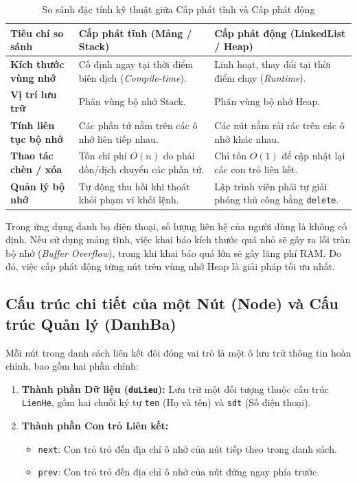 \documentclass[12pt,a4paper]{report}
\begin{document}
\begin{table}[htbp]
    \centering
    \small
    \begin{tabular}{|p{3.5cm}|p{5.5cm}|p{5.5cm}|}
    \hline
    \textbf{Tiêu chí so sánh} & \textbf{Cấp phát tĩnh (Mảng / Stack)} & \textbf{Cấp phát động (LinkedList / Heap)} \\ \hline
    \textbf{Kích thước vùng nhớ} & Cố định ngay tại thời điểm biên dịch (\textit{Compile-time}). & Linh hoạt, thay đổi tại thời điểm chạy (\textit{Runtime}). \\ \hline
    \textbf{Vị trí lưu trữ} & Phân vùng bộ nhớ Stack. & Phân vùng bộ nhớ Heap. \\ \hline
    \textbf{Tính liên tục bộ nhớ} & Các phần tử nằm trên các ô nhớ liên tiếp nhau. & Các nút nằm rải rác trên các ô nhớ khác nhau. \\ \hline
    \textbf{Thao tác chèn / xóa} & Tốn chi phí $O(n)$ do phải dồn/dịch chuyển các phần tử. & Chỉ tốn $O(1)$ để cập nhật lại các con trỏ liên kết. \\ \hline
    \textbf{Quản lý bộ nhớ} & Tự động thu hồi khi thoát khỏi phạm vi khối lệnh. & Lập trình viên phải tự giải phóng thủ công bằng \texttt{delete}. \\ \hline
    \end{tabular}
    \caption{So sánh đặc tính kỹ thuật giữa Cấp phát tĩnh và Cấp phát động}
\end{table}

Trong ứng dụng danh bạ điện thoại, số lượng liên hệ của người dùng là không cố định. Nếu sử dụng mảng tĩnh, việc khai báo kích thước quá nhỏ sẽ gây ra lỗi tràn bộ nhớ (\textit{Buffer Overflow}), trong khi khai báo quá lớn sẽ gây lãng phí RAM. Do đó, việc cấp phát động từng nút trên vùng nhớ Heap là giải pháp tối ưu nhất.

\subsection{Cấu trúc chi tiết của một Nút (Node) và Cấu trúc Quản lý (DanhBa)}
Mỗi nút trong danh sách liên kết đôi đóng vai trò là một ô lưu trữ thông tin hoàn chỉnh, bao gồm hai phần chính:
\begin{enumerate}
    \item \textbf{Thành phần Dữ liệu (\texttt{duLieu}):} Lưu trữ một đối tượng thuộc cấu trúc \texttt{LienHe}, gồm hai chuỗi ký tự \texttt{ten} (Họ và tên) và \texttt{sdt} (Số điện thoại).
    \item \textbf{Thành phần Con trỏ Liên kết:}
    \begin{itemize}
        \item \texttt{next}: Con trỏ trỏ đến địa chỉ ô nhớ của nút tiếp theo trong danh sách.
        \item \texttt{prev}: Con trỏ trỏ đến địa chỉ ô nhớ của nút đứng ngay phía trước.
    \end{itemize}
\end{enumerate}
\end{document}
